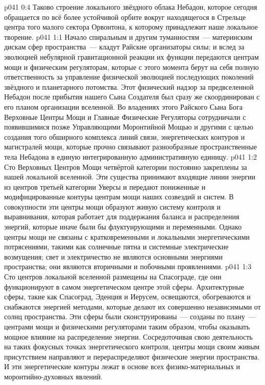 \vs p041 0:4 Таково строение локального звёздного облака Небадон, которое сегодня обращается по всё более устойчивой орбите вокруг находящегося в Стрельце центра того малого сектора Орвонтона, к которому принадлежит наше локальное творение.
\vs p041 1:1 Начало спиральным и другим туманностям~--- материнским дискам сфер пространства~--- кладут Райские организаторы силы; и вслед за эволюцией небулярной гравитационной реакции их функции передаются центрам мощи и физическим регуляторам, которые с этого момента берут на себя полную ответственность за управление физической эволюцией последующих поколений звёздного и планетарного потомства. Этот физический надзор за предвселенной Небадон после прибытия нашего Сына Создателя был сразу же скоординирован с его планом организации вселенной. Во владениях этого Райского Сына Бога Верховные Центры Мощи и Главные Физические Регуляторы сотрудничали с появившимися позже Управляющими Моронтийной Мощью и другими с целью создания того обширного комплекса линий связи, энергетических контуров и магистралей мощи, которые прочно связывают разнообразные пространственные тела Небадона в единую интегрированную административную единицу.
\vs p041 1:2 Сто Верховных Центров Мощи четвёртой категории постоянно закреплены за нашей локальной вселенной. Эти существа принимают входящие линии энергии из центров третьей категории Уверсы и передают пониженные и модифицированные контуры центрам мощи наших созвездий и систем. В совокупности эти центры мощи образуют живую систему контроля и выравнивания, которая работает для поддержания баланса и распределения энергий, которые иначе были бы флуктуирующими и переменными. Однако центры мощи не связаны с кратковременными и локальными энергетическими потрясениями, такими как солнечные пятна и системные электрические возмущения; свет и электричество не являются основными энергиями пространства; они являются вторичными и побочными проявлениями.
\vs p041 1:3 Сто центров локальной вселенной размещены на Спасограде, где они функционируют в самом энергетическом центре этой сферы. Архитектурные сферы, такие как Спасоград, Эденция и Иерусем, освещаются, обогреваются и снабжаются энергией методами, которые делают их совершенно независимыми от солнц пространства. Эти сферы были сконструированы~--- созданы по плану~--- центрами мощи и физическими регуляторами таким образом, чтобы оказывать мощное влияние на распределение энергии. Сосредоточивая свою деятельность на таких фокусных точках энергетического контроля, центры мощи своим живым присутствием направляют и перераспределяют физические энергии пространства. И эти энергетические контуры лежат в основе всех физико\hyp{}материальных и моронтийно\hyp{}духовных явлений.
